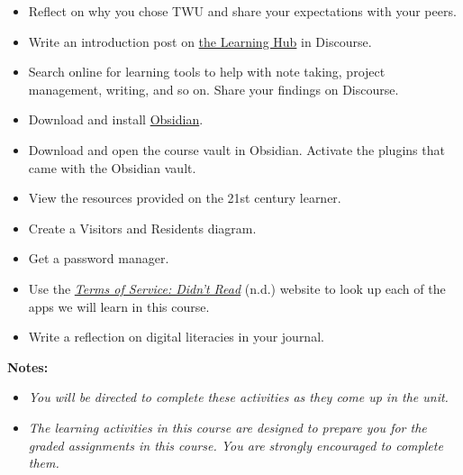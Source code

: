 \documentclass[
  letterpaper,
  DIV=11,
  numbers=noendperiod]{scrreprt}
\providecommand{\tightlist}{%
  \setlength{\itemsep}{0pt}\setlength{\parskip}{0pt}}\usepackage{longtable,booktabs,array}
\begin{document}
\begin{tcolorbox}[enhanced jigsaw, toprule=.15mm, colback=white, colframe=quarto-callout-note-color-frame, bottomtitle=1mm, leftrule=.75mm, coltitle=black, titlerule=0mm, rightrule=.15mm, colbacktitle=quarto-callout-note-color!10!white, left=2mm, title={Learning Activity}, opacitybacktitle=0.6, opacityback=0, breakable, toptitle=1mm, arc=.35mm, bottomrule=.15mm]

\begin{itemize}
\tightlist
\item
  Reflect on why you chose TWU and share your expectations with your
  peers.
\item
  Write an introduction post on \href{https://twu.discourse.group}{the
  Learning Hub} in Discourse.
\item
  Search online for learning tools to help with note taking, project
  management, writing, and so on. Share your findings on Discourse.
\item
  Download and install \href{https://obsidian.md}{Obsidian}.
\item
  Download and open the course vault in Obsidian. Activate the plugins
  that came with the Obsidian vault.
\item
  View the resources provided on the 21st century learner.
\item
  Create a Visitors and Residents diagram.
\item
  Get a password manager.
\item
  Use the \href{https://tosdr.org/}{\emph{Terms of Service: Didn't
  Read}} (n.d.) website to look up each of the apps we will learn in
  this course.
\item
  Write a reflection on digital literacies in your journal.
\end{itemize}

\begin{tcolorbox}[enhanced jigsaw, toprule=.15mm, colback=white, colframe=quarto-callout-note-color-frame, arc=.35mm, opacityback=0, breakable, rightrule=.15mm, bottomrule=.15mm, leftrule=.75mm, left=2mm]

\textbf{Notes:}

\begin{itemize}
\tightlist
\item
  \emph{You will be directed to complete these activities as they come
  up in the unit.}
\item
  \emph{The learning activities in this course are designed to prepare
  you for the graded assignments in this course. You are strongly
  encouraged to complete them.}
\end{itemize}


\end{tcolorbox}
\end{tcolorbox}
\end{document}
